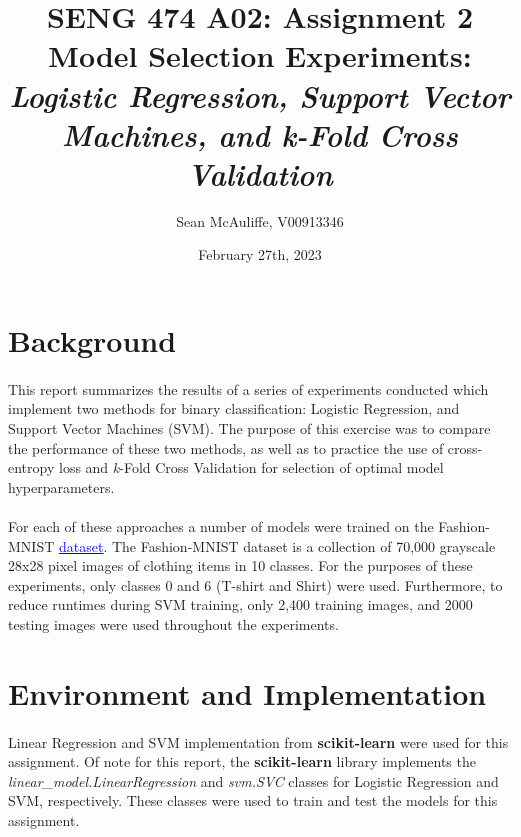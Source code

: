 \documentclass[12pt, letterpaper]{article}
\title{SENG 474 A02: Assignment 2 \\[1ex]
\large Model Selection Experiments:
\large \textit{Logistic Regression, Support Vector Machines, and k-Fold Cross Validation}}
\author{Sean McAuliffe, V00913346 }
\date{February 27th, 2023}
\begin{document}
\maketitle

\pagebreak
\tableofcontents  
\pagebreak

\section{Background}

\paragraph*{}This report summarizes the results of a series of experiments
conducted which implement two methods for binary classification: Logistic
Regression, and Support Vector Machines (SVM). The purpose of this exercise
was to compare the performance of these two methods, as well as to practice
the use of cross-entropy loss and \textit{k}-Fold Cross Validation for
selection of optimal model hyperparameters. 

\paragraph*{}For each of these approaches a number of models were trained on
the Fashion-MNIST
\href{github.com/zalandoresearch/fashion-mnist}{\textcolor{blue}{\underline{dataset}}}.
The Fashion-MNIST dataset is a collection of 70,000 grayscale 28x28 pixel images of
clothing items in 10 classes. For the purposes of these experiments, only
classes 0 and 6 (T-shirt and Shirt) were used. Furthermore, to reduce runtimes
during SVM training, only 2,400 training images, and 2000 testing images were used
throughout the experiments.

\section{Environment and Implementation}

\paragraph*{}Linear Regression and SVM implementation from \textbf{scikit-learn}
were used for this assignment. Of note for this report, the \textbf{scikit-learn}
library implements the \textit{linear\_model.LinearRegression} and \textit{svm.SVC}
classes for Logistic Regression and SVM, respectively. These classes were used
to train and test the models for this assignment. 
\end{document}
